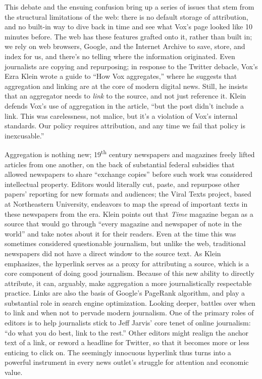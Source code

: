 This debate and the ensuing confusion bring up a series of issues that stem from the structural limitations of the web: there is no default storage of attribution, and no built-in way to dive back in time and see what Vox's page looked like 10 minutes before. The web has these features grafted onto it, rather than built in; we rely on web browsers, Google, and the Internet Archive to save, store, and index for us, and there's no telling where the information originated. Even journalists are copying and repurposing; in response to the Twitter debacle, Vox's Ezra Klein wrote a guide to ``How Vox aggregates,'' where he suggests that aggregation and linking are at the core of modern digital news. Still, he insists that an aggregator needs to \emph{link} to the source, and not just reference it. Klein defends Vox's use of aggregation in the article, ``but the post didn't include a link. This was carelessness, not malice, but it's a violation of Vox's internal standards. Our policy requires attribution, and any time we fail that policy is inexcusable.''\autocite{klein_how_2015}

Aggregation is nothing new; 19\textsuperscript{th} century newspapers and magazines freely lifted articles from one another, on the back of substantial federal subsidies that allowed newspapers to share ``exchange copies'' before such work was considered intellectual property.\autocite[90]{starr_creation_2004} Editors would literally cut, paste, and repurpose other papers' reporting for new formats and audiences; the Viral Texts project, based at Northeastern University, endeavors to map the spread of important texts in these newspapers from the era.\autocite{smith_infectious_2013} Klein points out that \emph{Time} magazine began as a source that would go through ``every magazine and newspaper of note in the world'' and take notes about it for their readers. Even at the time this was sometimes considered questionable journalism, but unlike the web, traditional newspapers did not have a direct window to the source text. As Klein emphasizes, the hyperlink serves as a proxy for attributing a source, which is a core component of doing good journalism. Because of this new ability to directly attribute, it can, arguably, make aggregation a more journalistically respectable practice. Links are also the basis of Google's PageRank algorithm, and play a substantial role in search engine optimization. Looking deeper, battles over when to link and when not to pervade modern journalism. One of the primary roles of editors is to help journalists stick to Jeff Jarvis' core tenet of online journalism: ``do what you do best, link to the rest.''\autocite{jarvis_new_2007} Other editors might realign the anchor text of a link, or reword a headline for Twitter, so that it becomes more or less enticing to click on.\autocite{thompson_upworthy:_2013} The seemingly innocuous hyperlink thus turns into a powerful instrument in every news outlet's struggle for attention and economic value.

